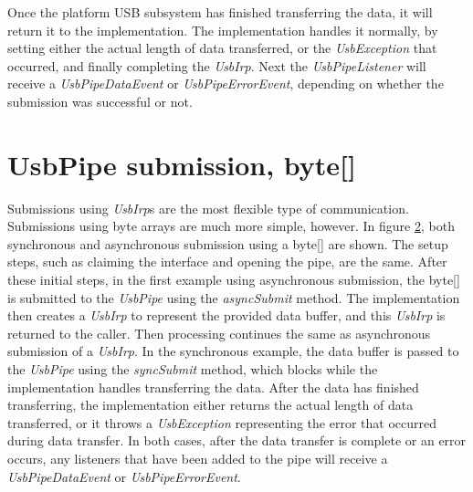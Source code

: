 \documentclass{article}
\newcommand{\myclass}[1]{\emph{#1}}
\newcommand{\myinterface}[1]{\emph{#1}}
\newcommand{\mymethod}[1]{\emph{#1}}
\newcommand{\mysectionend}[0]{\vfill\pagebreak[1]}
\begin{document}
Once the platform USB subsystem has finished transferring the data, it will return
it to the implementation.  The implementation handles it normally, by setting
either the actual length of data transferred, or the \myclass{UsbException} that occurred,
and finally completing the \myinterface{UsbIrp}.  Next the \myinterface{UsbPipeListener} will receive a
\myclass{UsbPipeDataEvent} or \myclass{UsbPipeErrorEvent}, depending on whether the submission was
successful or not.

\begin{figure}
\label{UsbPipeAsync}
\end{figure}

\mysectionend

%

\section{UsbPipe submission, byte[]}

Submissions using \myinterface{UsbIrp}s are the most flexible type of communication.
Submissions using byte arrays are much more simple, however.  In
figure \ref{UsbPipeByteArray}, both synchronous and asynchronous submission
using a byte[] are shown.  The setup steps, such as claiming the interface
and opening the pipe, are the same.  After these initial steps, in the
first example using asynchronous submission, the byte[] is submitted to
the \myinterface{UsbPipe} using the \mymethod{asyncSubmit} method.  The implementation then
creates a \myinterface{UsbIrp} to represent the provided data buffer, and this \myinterface{UsbIrp} is
returned to the caller.  Then processing continues the same as asynchronous
submission of a \myinterface{UsbIrp}.  In the synchronous example, the data buffer is passed
to the \myinterface{UsbPipe} using the \mymethod{syncSubmit} method, which blocks while the
implementation handles transferring the data.  After the data has finished
transferring, the implementation either returns the actual length of data
transferred, or it throws a \myclass{UsbException} representing the error that
occurred during data transfer.  In both cases, after the data transfer is complete
or an error occurs, any listeners that have been added to the pipe will receive
a \myclass{UsbPipeDataEvent} or \myclass{UsbPipeErrorEvent}.

\begin{figure}
\label{UsbPipeByteArray}
\end{figure}
\end{document}
